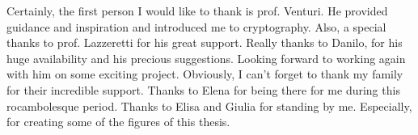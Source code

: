 \begin{acknowledgments}
    Certainly, the first person I would like to thank is prof. Venturi.
    \newline
    He provided guidance and inspiration and introduced me to cryptography.
    \newline\newline
    Also, a special thanks to prof. Lazzeretti for his great support.
    \newline\newline
    Really thanks to Danilo, for his huge availability and his precious suggestions.
    \newline
    Looking forward to working again with him on some exciting project.
    \newline\newline
    Obviously, I can't forget to thank my family for their incredible support.
    \newline\newline
    Thanks to Elena for being there for me during this rocambolesque period.
    \newline\newline
    Thanks to Elisa and Giulia for standing by me.
    \newline
    Especially, for creating some of the figures of this thesis.
\end{acknowledgments}